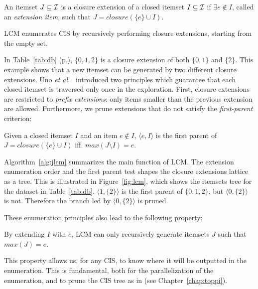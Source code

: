 \begin{definition}
	An itemset $J \subseteq {\cal I}$ is a closure extension of a closed itemset
  $I \subseteq {\cal I}$ if $\exists e \notin I$,
	called an {\em extension item}, such that $J=\mathit{closure}(\{e\}\cup I)$.
\end{definition}

LCM enumerates CIS by recursively performing closure extensions, starting from the empty set.

In Table~\ref{tab:db} (p.\pageref{tab:db}), $\{0,1,2\}$ is a closure extension of both $\{0,1\}$ and $\{2\}$.
This example shows that a new itemset can be generated by two different closure extensions.
Uno {\em et al.}~\cite{UnoDS04} introduced two principles
which guarantee that each closed itemset is traversed only once in the exploration.
First, closure extensions are restricted to {\em prefix extensions}:
only items smaller than the previous extension are allowed.
Furthermore, we prune extensions that do not satisfy the {\em first-parent} criterion:

\begin{definition}
	\label{def:firstparent}
	Given a closed itemset $I$ and an item $e \notin I$,
	$\langle e, I \rangle$ is the first parent of
	$J=\mathit{closure}(\{e\}\cup I)$ iff. $\mathit{max}(J\setminus I)=e$.
\end{definition}



Algorithm~\ref{alg:jlcm} summarizes the main function of LCM.
The extension enumeration order and the first parent test
shapes the closure extensions lattice as a tree.
This is illustrated in
Figure~\ref{fig:lcm}, which shows the itemsets tree for the dataset in Table~\ref{tab:db}.
$\langle 1, \{2\}\rangle$ is the first parent of $\{0,1,2\}$,
but $\langle 0, \{2\}\rangle$ is not.
Therefore the branch led by $\langle 0,\{2\}\rangle$ is pruned.

These enumeration principles also lead to the following property:
\begin{property}\label{prop:starters}
  By extending $I$ with $e$,
  LCM can only recursively generate itemsets $J$ such that $\mathit{max(J)}=e$.
\end{property}

This property allows us, for any CIS, to know where it will be outputted in the enumeration.
This is fundamental, both for the parallelization of the enumeration,
and to prune the CIS tree as in \toppi (see Chapter~\ref{chap:toppi}).


